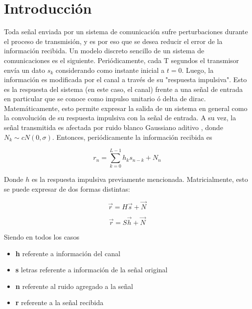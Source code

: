 \section{Introducci\'on}
Toda se\~nal enviada por un sistema de comunicaci\'on sufre perturbaciones durante el proceso de transmisi\'on, y es por eso que se desea reducir el error de la informaci\'on recibida.
Un modelo discreto sencillo de un sistema de comunicaciones es el siguiente. Peri\'odicamente, cada T segundos el transmisor env\'ia un dato $s_k$ considerando como instante inicial a $t = 0$. Luego, la informaci\'on es modificada por el canal a través de su "respuesta impulsiva". Esto es la respuesta del sistema (en este caso, el canal) frente a una se\~nal de entrada en particular que se conoce como impulso unitario \'o delta de dirac. Matem\'aticamente, esto permite expresar la salida de un sistema en general como la convoluci\'on de su respuesta impulsiva con la se\~nal de entrada.
A su vez, la señal transmitida es afectada por ruido blanco Gaussiano aditivo , donde $N_k \sim cN(0,\sigma)$. Entonces, peri\'odicamente la informaci\'on recibida es 

\begin{equation*} 
r_n = \sum_{k=0}^{L-1} h_k s_{n-k} + N_n 
\end{equation*} 

Donde $h$  es la respuesta impulsiva previamente mencionada. Matricialmente, esto se puede expresar de dos formas distintas:

\begin{equation}  
\vec{r} = H \vec{s} + \vec{N} 
\label{eq: r=hs+n}
\end{equation} 

\begin{equation} 
\vec{r} = S \vec{h} + \vec{N} 
\label{eq: r=sh+n}
\end{equation} 

Siendo en todos los casos 
\begin{itemize}
	\item \textbf{h} referente a información del canal
	\item \textbf{s} letras referente a información de la señal original
	\item \textbf{n} referente al ruido agregado a la señal
	\item \textbf{r} referente a la señal recibida
\end{itemize}
	
